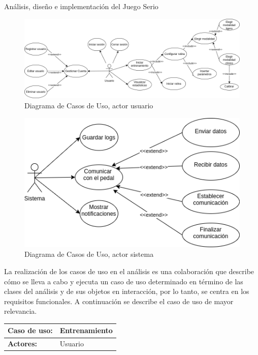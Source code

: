 \begin{thesischapter}{2} {Análisis, diseño e implementación del Juego Serio}
    \vspace*{50pt}
    \begin{figure}[h]
        \centering
        \includegraphics[scale=0.44]{images/diagram-usecase-user.png}
        \caption{Diagrama de Casos de Uso, actor usuario}
        \label{fig: use-cases-user}
    \end{figure}

    \vspace*{50pt}
    \begin{figure}[h]
        \centering
        \includegraphics[scale=0.44]{images/diagram-usecase-system.png}
        \caption{Diagrama de Casos de Uso, actor sistema}
        \label{fig: use-cases-system}
    \end{figure}

    \vspace*{100pt}
    La realización de los casos de uso en el análisis es una colaboración que describe cómo se lleva a cabo y ejecuta un caso de uso 
    determinado en término de las clases del análisis y de sus objetos en interacción, por lo tanto, se centra en los requisitos funcionales. 
    A continuación se describe el caso de uso de mayor relevancia.
    
    \begin{center}
        \begin{table}
            \begin{tabularx}{\textwidth}{|X|X|}
                \hline
                \textbf{Caso de uso:} & Entrenamiento \\\hline
                \textbf{Actores:}     & Usuario \\\hline
                

\end{tabularx}
\end{table}
\end{center}
\end{thesischapter}
